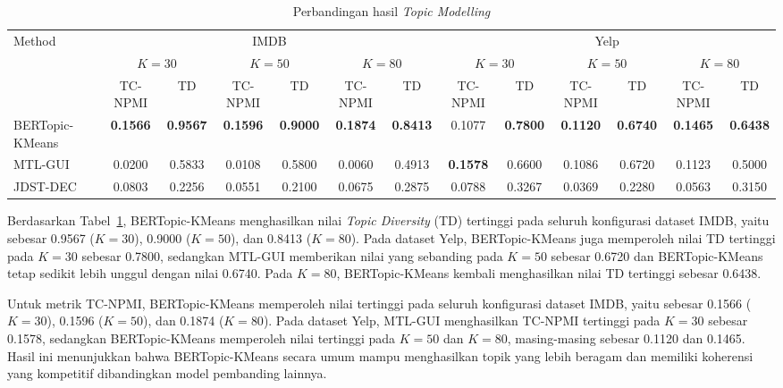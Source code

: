 \begin{table}[H]
\centering
\caption{Perbandingan hasil \textit{Topic Modelling}}
\label{tab:topic}
\small
\renewcommand{\arraystretch}{1.55}
\setlength{\tabcolsep}{6pt}
\begin{adjustbox}{width=\textwidth}
\begin{tabular}{|l|cc|cc|cc|cc|cc|cc|}
\hline
\multirow{3}{*}{Method}
  & \multicolumn{6}{c|}{IMDB}
  & \multicolumn{6}{c|}{Yelp} \\
\cline{2-13}
  & \multicolumn{2}{c|}{$K=30$}
  & \multicolumn{2}{c|}{$K=50$}
  & \multicolumn{2}{c|}{$K=80$}
  & \multicolumn{2}{c|}{$K=30$}
  & \multicolumn{2}{c|}{$K=50$}
  & \multicolumn{2}{c|}{$K=80$} \\
\cline{2-13}
  & TC-NPMI & TD
  & TC-NPMI & TD
  & TC-NPMI & TD
  & TC-NPMI & TD
  & TC-NPMI & TD
  & TC-NPMI & TD \\
\hline
BERTopic-KMeans
  & \textbf{0.1566} & \textbf{0.9567}
  & \textbf{0.1596} & \textbf{0.9000}
  & \textbf{0.1874} & \textbf{0.8413}
  & 0.1077 & \textbf{0.7800}
  & \textbf{0.1120} & \textbf{0.6740}
  & \textbf{0.1465} & \textbf{0.6438} \\
\hline
MTL-GUI
  & 0.0200 & 0.5833
  & 0.0108 & 0.5800
  & 0.0060 & 0.4913
  & \textbf{0.1578} & 0.6600
  & 0.1086 & 0.6720
  & 0.1123 & 0.5000 \\
\hline
JDST-DEC
  & 0.0803 & 0.2256
  & 0.0551 & 0.2100
  & 0.0675 & 0.2875
  & 0.0788 & 0.3267
  & 0.0369 & 0.2280
  & 0.0563 & 0.3150 \\
\hline
\end{tabular}
\end{adjustbox}
\end{table}

Berdasarkan Tabel~\ref{tab:topic}, BERTopic-KMeans menghasilkan nilai
\textit{Topic Diversity} (TD) tertinggi pada seluruh konfigurasi dataset
IMDB, yaitu sebesar 0.9567 ($K=30$), 0.9000 ($K=50$), dan 0.8413 ($K=80$).
Pada dataset Yelp, BERTopic-KMeans juga memperoleh nilai TD tertinggi pada
$K=30$ sebesar 0.7800, sedangkan MTL-GUI memberikan nilai yang sebanding
pada $K=50$ sebesar 0.6720 dan BERTopic-KMeans tetap sedikit lebih unggul
dengan nilai 0.6740. Pada $K=80$, BERTopic-KMeans kembali menghasilkan
nilai TD tertinggi sebesar 0.6438.

Untuk metrik TC-NPMI, BERTopic-KMeans memperoleh nilai tertinggi pada
seluruh konfigurasi dataset IMDB, yaitu sebesar 0.1566 ($K=30$), 0.1596
($K=50$), dan 0.1874 ($K=80$). Pada dataset Yelp, MTL-GUI menghasilkan
TC-NPMI tertinggi pada $K=30$ sebesar 0.1578, sedangkan BERTopic-KMeans
memperoleh nilai tertinggi pada $K=50$ dan $K=80$, masing-masing sebesar
0.1120 dan 0.1465. Hasil ini menunjukkan bahwa BERTopic-KMeans secara umum
mampu menghasilkan topik yang lebih beragam dan memiliki koherensi yang
kompetitif dibandingkan model pembanding lainnya.

